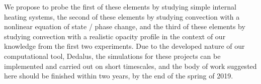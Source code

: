 \documentclass[aasms,12pt]{article}
\begin{document}
We propose to probe the first of these elements by studying simple internal heating systems,
the second of these elements by studying convection with a nonlinear equation of state / phase
change, and the third of these elements by studying convection with a realistic opacity profile
in the context of our knowledge from the first two experiments.  Due to the developed nature of
our computational tool, Dedalus, the simulations for these projects can be implemented and
carried out on short timescales, and the body of work suggested here should be finished within
two years, by the end of the spring of 2019.





\end{document}

